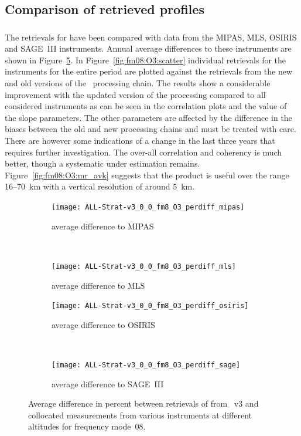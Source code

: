 \subsection{Comparison of retrieved profiles}
\label{sec:fm08:comparison}



\subsubsection{}
\label{sec:fm08:comparison:O3}
The retrievals for  have been compared with data from the MIPAS, MLS,
OSIRIS and SAGE~III instruments. Annual average differences to these
instruments are shown in Figure~\ref{fig:fm08:O3:profiles}. In
Figure~\ref{fig:fm08:O3:scatter} individual retrievals for the instruments for
the entire period are plotted against the retrievals from the new and old
versions of the \smr\ processing chain. The results show a considerable
improvement with the updated version of the processing compared to all
considered instruments as can be seen in the correlation plots and the value of the slope parameters. The other parameters are affected by the difference in the biases between the old and new processing chains and must be treated with care.  There are however some indications of a change in the last three years 
that requires further investigation. 
The over-all correlation and coherency is much better,
though a systematic under estimation remains.
Figure~\ref{fig:fm08:O3:mr_avk} suggests that the product is useful over the
range 16--70~km with a vertical resolution of around 5~km.

\begin{figure}[tbhp]
    \centering
    \begin{subfigure}[b]{0.49\textwidth}
        \texttt{[image: ALL-Strat-v3\_0\_0\_fm8\_O3\_perdiff\_mipas]}
        \caption{average difference to MIPAS}
        \label{fig:fm08:O3:profiles:MIPAS}
    \end{subfigure}
    \,
    \begin{subfigure}[b]{0.49\textwidth}
        \texttt{[image: ALL-Strat-v3\_0\_0\_fm8\_O3\_perdiff\_mls]}
        \caption{average difference to MLS}
        \label{fig:fm08:O3:profiles:MLS}
    \end{subfigure}

    \begin{subfigure}[b]{0.49\textwidth}
        \texttt{[image: ALL-Strat-v3\_0\_0\_fm8\_O3\_perdiff\_osiris]}
        \caption{average difference to OSIRIS}
        \label{fig:fm08:O3:profiles:OSIRIS}
    \end{subfigure}
    \,
    \begin{subfigure}[b]{0.49\textwidth}
        \texttt{[image: ALL-Strat-v3\_0\_0\_fm8\_O3\_perdiff\_sage]}
        \caption{average difference to SAGE~III}
        \label{fig:fm08:O3:profiles:SAGEIII}
    \end{subfigure}
    \caption{Average difference in percent between retrievals of 
    from \smr~v3 and collocated measurements from various instruments at
    different altitudes for frequency mode~08.}

    \label{fig:fm08:O3:profiles}
\end{figure}


